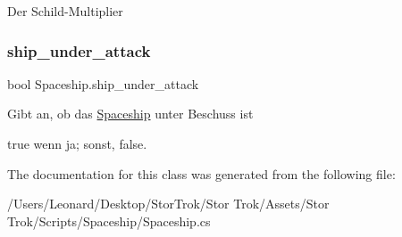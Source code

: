 Der Schild-\/\+Multiplier\mbox{\label{class_spaceship_ae627cd6b28077cea3ca7d50e1c3eea8d}} 
\subsubsection{\texorpdfstring{ship\+\_\+under\+\_\+attack}{ship\_under\_attack}}
{\footnotesize\ttfamily bool Spaceship.\+ship\+\_\+under\+\_\+attack\hspace{0.3cm}{\ttfamily [get]}}



Gibt an, ob das \hyperlink{class_spaceship}{Spaceship} unter Beschuss ist 

{\ttfamily true} wenn ja; sonst, {\ttfamily false}.

The documentation for this class was generated from the following file\+:\begin{DoxyCompactItemize}
\item 
/\+Users/\+Leonard/\+Desktop/\+Stor\+Trok/\+Stor Trok/\+Assets/\+Stor Trok/\+Scripts/\+Spaceship/Spaceship.\+cs\end{DoxyCompactItemize}
